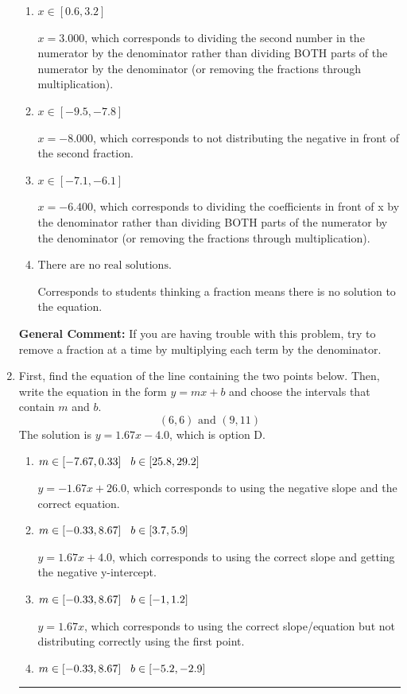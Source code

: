\documentclass{extbook}[14pt]
\newcommand{\litem}[1]{\item #1

\rule{\textwidth}{0.4pt}}
\begin{document}
\begin{enumerate}
{\begin{enumerate}[label=\Alph*.]
* $x = -4.800$, which is the correct option.
\item \( x \in [0.6, 3.2] \)

 $x = 3.000$, which corresponds to dividing the second number in the numerator by the denominator rather than dividing BOTH parts of the numerator by the denominator (or removing the fractions through multiplication).
\item \( x \in [-9.5, -7.8] \)

 $x = -8.000$, which corresponds to not distributing the negative in front of the second fraction.
\item \( x \in [-7.1, -6.1] \)

 $x = -6.400$, which corresponds to dividing the coefficients in front of x by the denominator rather than dividing BOTH parts of the numerator by the denominator (or removing the fractions through multiplication).
\item \( \text{There are no real solutions.} \)

Corresponds to students thinking a fraction means there is no solution to the equation.
\end{enumerate}

\textbf{General Comment:} If you are having trouble with this problem, try to remove a fraction at a time by multiplying each term by the denominator.
}
\litem{
First, find the equation of the line containing the two points below. Then, write the equation in the form $ y=mx+b $ and choose the intervals that contain $m$ and $b$.
\[ (6, 6) \text{ and } (9, 11) \]The solution is \( y = 1.67x -4.0 \), which is option D.\begin{enumerate}[label=\Alph*.]
\item \( m \in [-7.67, 0.33] \hspace*{3mm} b \in [25.8, 29.2] \)

 $y = -1.67x + 26.0$, which corresponds to using the negative slope and the correct equation.
\item \( m \in [-0.33, 8.67] \hspace*{3mm} b \in [3.7, 5.9] \)

 $y = 1.67x + 4.0$, which corresponds to using the correct slope and getting the negative y-intercept.
\item \( m \in [-0.33, 8.67] \hspace*{3mm} b \in [-1, 1.2] \)

 $y = 1.67x$, which corresponds to using the correct slope/equation but not distributing correctly using the first point.
\item \( m \in [-0.33, 8.67] \hspace*{3mm} b \in [-5.2, -2.9] \)


\end{enumerate}}
\end{enumerate}
\end{document}
